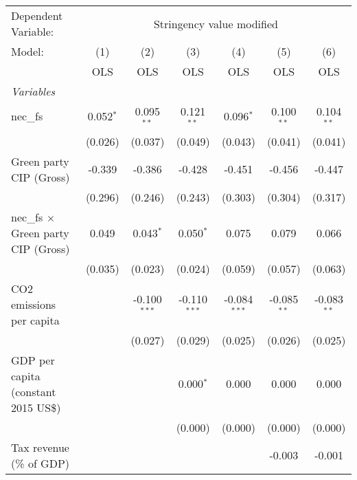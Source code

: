 
\begingroup
\centering
\begin{tabular}{lcccccc}
   \toprule
   Dependent Variable: & \multicolumn{6}{c}{Stringency value modified}\\
   Model:                                     & (1)         & (2)            & (3)            & (4)            & (5)           & (6)\\  
                                              &  OLS        & OLS            & OLS            & OLS            & OLS           & OLS\\  
   \midrule
   \emph{Variables}\\
   nec\_fs                                    & 0.052$^{*}$ & 0.095$^{**}$   & 0.121$^{**}$   & 0.096$^{*}$    & 0.100$^{**}$  & 0.104$^{**}$\\   
                                              & (0.026)     & (0.037)        & (0.049)        & (0.043)        & (0.041)       & (0.041)\\   
   Green party CIP (Gross)                    & -0.339      & -0.386         & -0.428         & -0.451         & -0.456        & -0.447\\   
                                              & (0.296)     & (0.246)        & (0.243)        & (0.303)        & (0.304)       & (0.317)\\   
   nec\_fs $\times$ Green party CIP (Gross)   & 0.049       & 0.043$^{*}$    & 0.050$^{*}$    & 0.075          & 0.079         & 0.066\\   
                                              & (0.035)     & (0.023)        & (0.024)        & (0.059)        & (0.057)       & (0.063)\\   
   CO2 emissions per capita                   &             & -0.100$^{***}$ & -0.110$^{***}$ & -0.084$^{***}$ & -0.085$^{**}$ & -0.083$^{**}$\\   
                                              &             & (0.027)        & (0.029)        & (0.025)        & (0.026)       & (0.025)\\   
   GDP per capita (constant 2015 US\$)        &             &                & 0.000$^{*}$    & 0.000          & 0.000         & 0.000\\   
                                              &             &                & (0.000)        & (0.000)        & (0.000)       & (0.000)\\   
   Tax revenue (\% of GDP)                    &             &                &                &                & -0.003        & -0.001\\   

\end{tabular}

